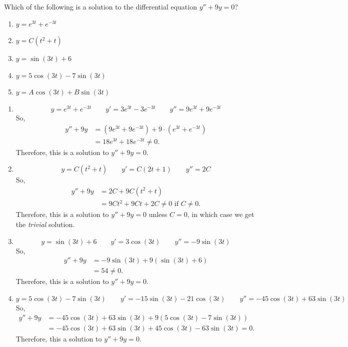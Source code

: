 \documentclass[noinstructornotes]{ximera}
\begin{document}
\begin{problem}
Which of the following is a solution to the differential equation $y'' + 9y = 0$?
	\begin{enumerate}
	\item  $y=e^{3t}+e^{-3t}$
	\item  $y=C(t^2 + t)$
	\item  $y=\sin(3t) + 6$
	\item  $y=5 \cos(3t) - 7 \sin(3t)$
	\item  $y=A \cos(3t) + B \sin(3t)$ 
	\end{enumerate}
	
	\begin{freeResponse}
	\begin{enumerate}
	
	\item  \[ y = e^{3t}+e^{-3t} 	\qquad	y'=3e^{3t}-3e^{-3t} 	\qquad	y''=9e^{3t}+9e^{-3t} \]  
	So,
		\begin{align*}
		y''+9y &= (9e^{3t}+9e^{-3t}) + 9\cdot (e^{3t}+e^{-3t})  \\
		&= 18e^{3t} + 18e^{-3t} \neq 0.
		\end{align*}
	Therefore, this is  a solution to $y''+9y=0$.
	
	
	
	\item  \[ y = C(t^2+t) 	\qquad	y'=C(2t+1) 	\qquad	y''=2C \] 
	So,
		\begin{align*}
		y''+9y &= 2C + 9C(t^2+t)  \\
		&= 9Ct^2 + 9Ct + 2C \neq 0 \text{ if } C \neq 0.
		\end{align*}
	Therefore, this is  a solution to $y''+9y=0$ unless $C=0$, in which case we get the {\it trivial} solution.
	
	
	
	\item  \[ y = \sin(3t)+6 	\qquad	y'=3\cos(3t) 	\qquad	y''=-9\sin(3t) \]  
	So,
		\begin{align*}
		y''+9y 
		&= -9\sin(3t) +9(\sin(3t) + 6)  \\
		&= 54 \neq 0.
		\end{align*}
	Therefore, this is  a solution to $y''+9y=0$.
	
	
	
	\item  \[ y = 5\cos(3t)-7\sin(3t) 	\qquad	y'=-15\sin(3t)-21\cos(3t) 	\qquad	y''=-45\cos(3t)+63\sin(3t) \]  
	So,
		\begin{align*}
		y''+9y 
		&= -45\cos(3t)+63\sin(3t) +9(5\cos(3t)-7\sin(3t))  \\
		&= -45\cos(3t)+63\sin(3t) + 45\cos(3t) - 63\sin(3t) = 0.
		\end{align*}
	Therefore, this  a solution to $y''+9y=0$.
	

\end{enumerate}
\end{freeResponse}
\end{problem}
\end{document}

